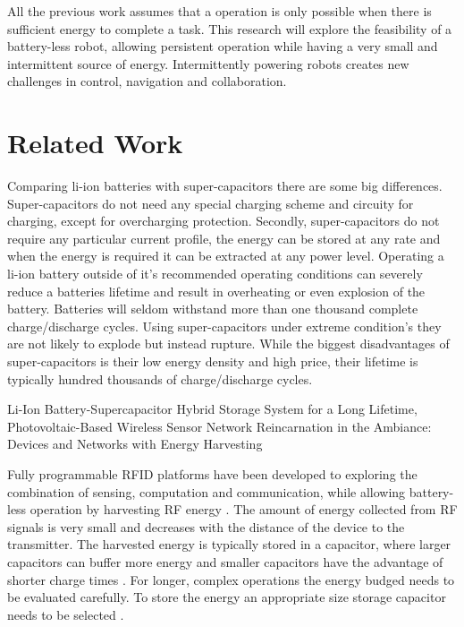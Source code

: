 \documentclass[letterpaper, 10 pt, conference]{ieeeconf}  %
\begin{document}
All the previous work assumes that a operation is only possible when there is sufficient energy to complete a task. 
This research will explore the feasibility of a battery-less robot, allowing persistent operation while having a very small and intermittent source of energy.
Intermittently powering robots creates new challenges in control, navigation and collaboration.

\section{Related Work}


Comparing li-ion batteries with super-capacitors there are some big differences.
Super-capacitors do not need any special charging scheme and circuity for charging, except for overcharging protection.
Secondly, super-capacitors do not require any particular current profile, the energy can be stored at any rate and when the energy is required it can be extracted at any power level.
Operating a li-ion battery outside of it's recommended operating conditions can severely reduce a batteries lifetime and result in overheating or even explosion of the battery.
Batteries will seldom withstand more than one thousand complete charge/discharge cycles.
Using super-capacitors under extreme condition's they are not likely to explode but instead rupture.
While the biggest disadvantages of super-capacitors is their low energy density and high price, their lifetime is typically hundred thousands of charge/discharge cycles.

Li-Ion Battery-Supercapacitor Hybrid Storage System for a Long Lifetime, Photovoltaic-Based Wireless Sensor Network	\cite{ongaro_pwre_2012}
Reincarnation in the Ambiance: Devices and Networks with Energy Harvesting \cite{prasad_comst_2014}





Fully programmable RFID platforms have been developed to exploring the combination of sensing, computation and communication, while allowing battery-less operation by harvesting RF energy \cite{sample_transim_2008}.
The amount of energy collected from RF signals is very small and decreases with the distance of the device to the transmitter.
The harvested energy is typically stored in a capacitor, where larger capacitors can buffer more energy and smaller capacitors have the advantage of shorter charge times \cite{gummerson_mobisys_2010}.
For longer, complex operations the energy budged needs to be evaluated carefully.
To store the energy an appropriate size storage capacitor needs to be selected \cite{naderiparizi_rfid_2015}.
\end{document}
